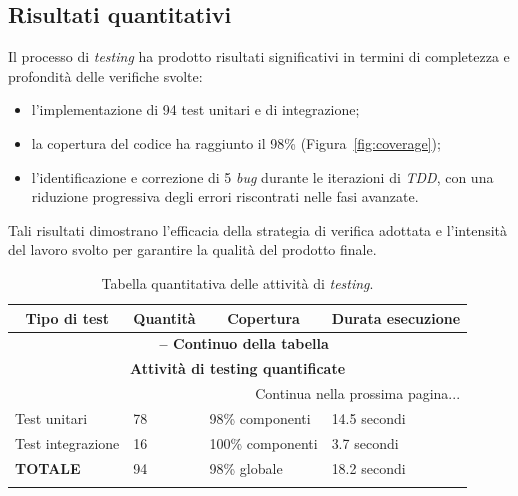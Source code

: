 \subsection{Risultati quantitativi}
Il processo di \textit{testing} ha prodotto risultati significativi in termini di completezza e profondità delle verifiche svolte:
\begin{itemize}
    \item l'implementazione di 94 test unitari e di integrazione;
    \item la copertura del codice ha raggiunto il 98\% (Figura~\ref{fig:coverage});
    \item l'identificazione e correzione di 5 \textit{bug} durante le iterazioni di \textit{TDD}, con una riduzione progressiva degli errori riscontrati nelle fasi avanzate.
\end{itemize}
Tali risultati dimostrano l'efficacia della strategia di verifica adottata e l'intensità del lavoro svolto per garantire la qualità del prodotto finale.  

\begin{center}
\begin{longtable}{|p{}|p{}|p{}|p{}|}
\hline
\multicolumn{1}{|c|}{\textbf{Tipo di test}} & 
\multicolumn{1}{c|}{\textbf{Quantità}} & 
\multicolumn{1}{c|}{\textbf{Copertura}} & 
\multicolumn{1}{c|}{\textbf{Durata esecuzione}} \\ 
\hline
\endfirsthead

\multicolumn{4}{c}{{\bfseries \tablename\ \thetable{} -- Continuo della tabella}}\\
\hline
\multicolumn{4}{|c|}{\textbf{Attività di testing quantificate}} \\ \hline
\endhead

\hline \multicolumn{4}{|r|}{{Continua nella prossima pagina...}} \\ \hline
\endfoot

\endlastfoot

Test unitari & 78 & 98\% componenti & 14.5 secondi \\ \hline
Test integrazione & 16 & 100\% componenti & 3.7 secondi \\ \hline
\textbf{TOTALE} & 94 & 98\% globale & 18.2 secondi \\ \hline

\caption{Tabella quantitativa delle attività di \textit{testing}.}
\label{tab:attivita-testing}
\end{longtable}
\end{center}


